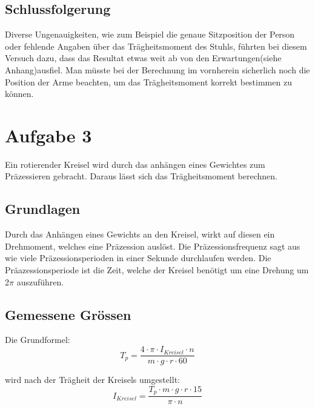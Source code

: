 \documentclass{article}
\begin{document}
\subsection{Schlussfolgerung}

Diverse Ungenauigkeiten, wie zum Beispiel die genaue Sitzposition der Person oder fehlende Angaben über das Trägheitsmoment des Stuhls, führten bei diesem Versuch dazu, dass das Resultat etwas weit ab von den Erwartungen(siehe Anhang)ausfiel. Man müsste bei der Berechnung im vornherein sicherlich noch die Position der Arme beachten, um das Trägheitsmoment korrekt bestimmen zu können.
\newpage
\section{Aufgabe 3}

Ein rotierender Kreisel wird durch das anhängen eines Gewichtes zum Präzessieren gebracht. Daraus lässt sich das Trägheitsmoment berechnen. 
\subsection{Grundlagen}
Durch das Anhängen eines Gewichts an den Kreisel, wirkt auf diesen ein Drehmoment, welches eine 
Präzession auslöst. Die Präzessionsfrequenz sagt aus wie viele Präzessionsperioden in einer Sekunde 
durchlaufen werden. Die Präazessionsperiode ist die Zeit, welche der Kreisel benötigt um eine Drehung um 2$\pi$ auszuführen.
\subsection{Gemessene Grössen}
Die Grundformel: \vspace{0.2cm}\\
\begin{equation}
T_p = \frac{4\cdot\pi\cdot I_{Kreisel}\cdot n}{m\cdot g\cdot r\cdot 60}
\end{equation}


wird nach der Trägheit der Kreisels umgestellt:
\begin{equation}
I_{Kreisel}= \frac{T_p\cdot m\cdot g\cdot r \cdot 15}{ \pi \cdot n}
\end{equation}
\end{document}
